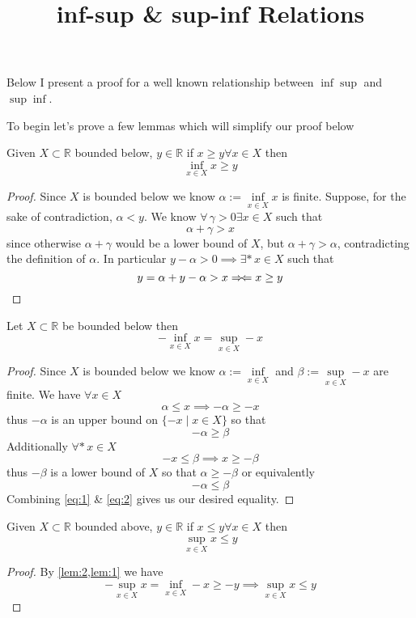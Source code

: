 \documentclass{article}
\title{inf-sup \& sup-inf Relations}
\begin{document}
 Below I present a proof for a well known relationship between $\inf\sup$ and $\sup\inf$.

To begin let's prove a few lemmas which will simplify our proof below
\begin{lemma}\label{lem:1}
  Given $X \subset \mathbb{R}$ bounded below, $y \in \mathbb{R}$ if $x \ge y \forall x \in X$ then
  $$
    \inf_{x \in X} x \ge y
  $$
\end{lemma}
\begin{proof}
  Since $X$ is bounded below we know $\alpha := \inf\limits_{x \in X} x$ is finite. Suppose, for the sake of contradiction, $\alpha < y$. We know $\forall \, \gamma > 0 \exists x \in X$ such that
  $$
    \alpha + \gamma > x
  $$
  since otherwise $\alpha + \gamma$ would be a lower bound of $X$, but $\alpha + \gamma > \alpha$, contradicting the definition of $\alpha$. In particular $y - \alpha > 0 \implies \exists* \, x \in X$ such that
  $$
    y = \alpha + y - \alpha > x \Rightarrow\!\Leftarrow x \ge y
  $$
\end{proof}
\begin{lemma}\label{lem:2}
  Let $X \subset \mathbb{R}$ be bounded below then
  $$
    - \inf_{x \in X} x = \sup_{x \in X} -x
  $$
\end{lemma}
\begin{proof}
  Since $X$ is bounded below we know $\alpha := \inf\limits_{x \in X}$ and $\beta := \sup\limits_{x \in X} -x$ are finite. We have $\forall x \in X$
  $$
    \alpha \le x \implies - \alpha \ge -x
  $$
  thus $-\alpha$ is an upper bound on $\{ -x \mid x \in X \}$ so that
  \begin{equation}
    -\alpha \ge \beta \label{eq:1}
  \end{equation}
  Additionally $\forall* \, x \in X$
  $$
    -x \le \beta \implies x \ge -\beta
  $$
  thus $-\beta$ is a lower bound of $X$ so that $\alpha \ge -\beta$ or equivalently
  \begin{equation}
    -\alpha \le \beta \label{eq:2}
  \end{equation}
  Combining \eqref{eq:1} \& \eqref{eq:2} gives us our desired equality.
\end{proof}
\begin{lemma}\label{lem:3}
  Given $X \subset \mathbb{R}$ bounded above, $y \in \mathbb{R}$ if $x \le y \forall x \in X$ then
  $$
    \sup_{x \in X} x \le y
  $$
\end{lemma}
\begin{proof}
  By \cref{lem:2,lem:1} we have
  $$
    -\sup_{x \in X} x = \inf\limits_{x \in X} -x \ge -y \implies \sup_{x \in X} x \le y
  $$
\end{proof}
\end{document}

